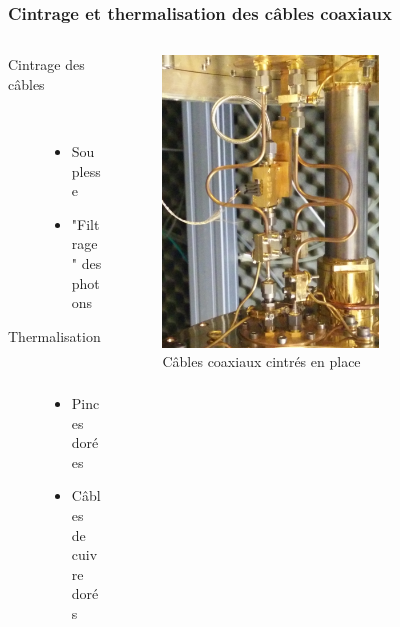 \documentclass[10pt,a9paper,handout]{beamer} \usepackage[utf8]{inputenc} \usepackage[francais]{babel} \usepackage[T1]{fontenc}
\begin{document}
\begin{frame}
\frametitle{Cintrage et thermalisation des câbles coaxiaux}
\begin{columns}
\begin{column}{0.6\textwidth}
    \begin{description}
        \item[Cintrage des câbles]~\\
        \begin{itemize}
            \item Souplesse
            \item "Filtrage" des photons
        \end{itemize}
        \vspace*{5mm}
        \item[Thermalisation]~\\
        \begin{itemize}
            \item Pinces dorées
            \item Câbles de cuivre dorés
        \end{itemize}
    \end{description}
\end{column}
\begin{column}{0.5\textwidth}
\begin{figure}[h]
    \begin{center}
        \includegraphics[width=0.7\textwidth]{Images/Coax/cintrage}
        \caption{Câbles coaxiaux cintrés en place}
    \end{center}
\end{figure}
\end{column}
\end{columns}
\end{frame}
\end{document}
